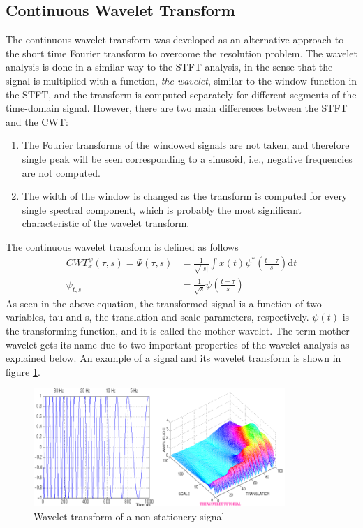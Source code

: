 \documentclass[12pt, a4paper, twoside]{report}
\begin{document}
\subsection{Continuous Wavelet Transform}
The continuous wavelet transform was developed as an alternative approach to the short time Fourier transform to overcome the resolution problem. The wavelet analysis is done in a similar way to the STFT analysis, in the sense that the signal is multiplied with a function, {\it the wavelet}, similar to the window function in the STFT, and the transform is computed separately for different segments of the time-domain signal. However, there are two main differences between the STFT and the CWT: 
\begin{enumerate}
\item The Fourier transforms of the windowed signals are not taken, and therefore single peak will be seen corresponding to a sinusoid, i.e., negative frequencies are not computed. 
\item The width of the window is changed as the transform is computed for every single spectral component, which is probably the most significant characteristic of the wavelet transform. 
\end{enumerate}
The continuous wavelet transform is defined as follows
\begin{align}
CWT_{x}^{\psi}(\tau, s) = \Psi (\tau, s) &= \frac{1}{\sqrt{\left | s \right |}} \int x(t) \psi^{*} \left ( \frac{t-\tau}{s} \right ) \text{d}t \\
\psi_{t,s} &= \frac{1}{\sqrt{s}} \psi \left ( \frac{t - \tau}{s} \right )
\end{align}
As seen in the above equation, the transformed signal is a function of two variables, tau and s, the translation and scale parameters, respectively. $\psi(t)$ is the transforming function, and it is called the mother wavelet. The term mother wavelet gets its name due to two important properties of the wavelet analysis as explained below. An example of a signal and its wavelet transform is shown in figure \ref{fig:dwt-non-stationery}.
\begin{figure}[!h]
	\centering
	\includegraphics[width=0.85\textwidth]
	{images/chapter3/dwt-non-stationery}
	\caption{Wavelet transform of a non-stationery signal}
	\label{fig:dwt-non-stationery}
\end{figure}
\end{document}
